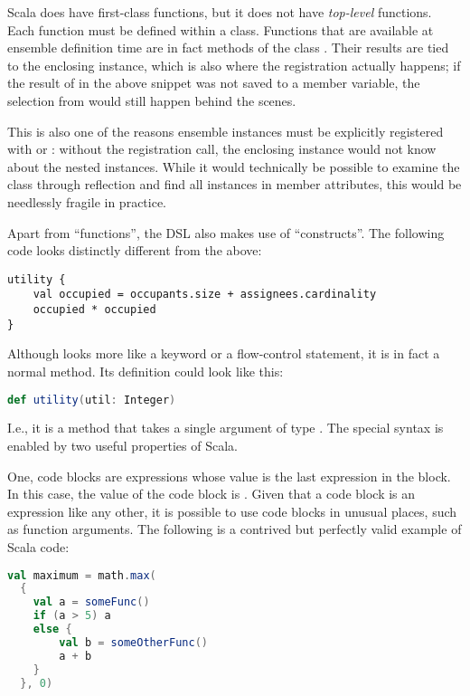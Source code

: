 Scala does have first-class functions, but it does not have \textit{top-level}
functions. Each function must be defined within a class. Functions that are available at
ensemble definition time are in fact methods of the class . Their results
are tied to the enclosing  instance, which is also where the registration
actually happens; if the result of  in the above snippet was not saved to a
member variable, the selection from  would still happen behind the scenes.

This is also one of the reasons ensemble instances must be explicitly registered with
 or : without the registration call, the enclosing instance
would not know about the nested instances. While it would technically be possible to
examine the class through reflection and find all  instances in member
attributes, this would be needlessly fragile in practice.

\medskip

Apart from ``functions'', the DSL also makes use of ``constructs''. The following code
looks distinctly different from the above:

\begin{lstlisting}[style=snippet]
utility {
    val occupied = occupants.size + assignees.cardinality
    occupied * occupied
}
\end{lstlisting}

Although  looks more like a keyword or a flow-control statement, it is in
fact a normal method. Its definition could look like this:

\begin{lstlisting}[style=snippet, language=Scala]
def utility(util: Integer)
\end{lstlisting}

I.e., it is a method that takes a single argument of type . The special
syntax is enabled by two useful properties of Scala.

One, code blocks are expressions whose value is the last expression in the block. In
this case, the value of the code block is . Given that a code
block is an expression like any other, it is possible to use code blocks in unusual
places, such as function arguments. The following is a contrived but perfectly valid
example of Scala code:

\begin{lstlisting}[style=ensembles, language=Scala]
val maximum = math.max(
  {
    val a = someFunc()
    if (a > 5) a
    else {
        val b = someOtherFunc()
        a + b
    }
  }, 0)
\end{lstlisting}

